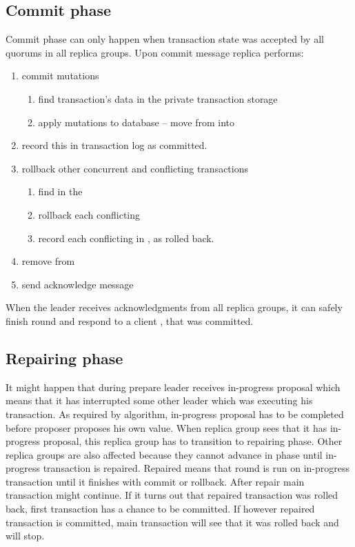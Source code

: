 \subsection{Commit phase}
Commit phase can only happen when transaction state \txState was accepted by all quorums in all replica groups. Upon commit message replica performs:
\begin{enumerate}
\item commit mutations \mutations
\begin{enumerate}
   \item find transaction’s data in the private transaction storage \txStorage
   \item apply mutations to database \database  -- move \mutations from \txStorage into \database
   \end{enumerate}
\item record this \txState in transaction log \txLog as committed.
\item rollback other concurrent and conflicting transactions \conflictingTxSet
 \begin{enumerate}
   \item find \conflictingTxSet in the \txIndex
   \item rollback each conflicting 
   \item record each conflicting  in \txLog, as rolled back.
  \end{enumerate}
\item remove \txState from \txIndex
\item send acknowledge message 
\end{enumerate}

When the leader receives acknowledgments from all replica groups, it can safely finish \mpt round and respond to a client \client, that \transaction was committed.


\subsection{Repairing phase}
It might happen that during prepare leader receives in-progress proposal which means that it has interrupted some other leader which was executing his transaction. As required by \paxos algorithm, in-progress proposal has to be completed before proposer proposes his own value. When replica group sees that it has in-progress proposal, this replica group has to transition to repairing phase. 
Other replica groups are also affected because they cannot advance in phase until in-progress transaction is repaired. Repaired means that \mpt round is run on in-progress transaction until it finishes with commit or rollback. 
After repair main transaction might continue. If it turns out that repaired transaction was rolled back, first transaction has a chance to be committed. If however repaired transaction is committed, main transaction will see that it was rolled back and will stop.



